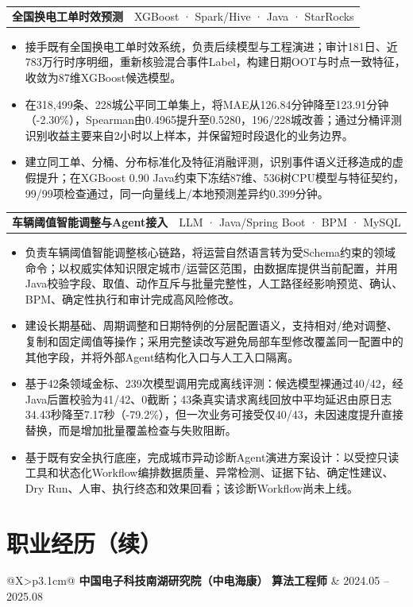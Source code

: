 \documentclass[UTF8,fontset=fandol,10pt,a4paper]{ctexart}
\makeatletter
\newcommand{\daterange}[1]{\textcolor{secondary}{\small #1}}
\newcommand{\companyentry}[4]{%
  \begin{tabularx}{\textwidth}{@{}X>{\raggedleft\arraybackslash}p{3.1cm}@{}}
    \textbf{#1} \quad \textbf{#2} & \daterange{#3} \\
    \multicolumn{2}{@{}l@{}}{\textcolor{secondary}{\small #4}}
  \end{tabularx}
}
\newcommand{\projecttitle}[2]{%
  \vspace{0.18em}%
  \begin{tabularx}{\textwidth}{@{}X>{\raggedleft\arraybackslash}p{7.2cm}@{}}
    \textbf{#1} & \textcolor{secondary}{\small #2}
  \end{tabularx}
}
\makeatother
\begin{document}
\projecttitle{全国换电工单时效预测}{XGBoost · Spark/Hive · Java · StarRocks}
\begin{itemize}
  \item 接手既有全国换电工单时效系统，负责后续模型与工程演进；审计181日、近783万行时序明细，重新核验混合事件Label，构建日期OOT与时点一致特征，收敛为87维XGBoost候选模型。
  \item 在318,499条、228城公平同工单集上，将MAE从126.84分钟降至123.91分钟（-2.30\%），Spearman由0.4965提升至0.5280，196/228城改善；通过分桶评测识别收益主要来自2小时以上样本，并保留短时段退化的业务边界。
  \item 建立同工单、分桶、分布标准化及特征消融评测，识别事件语义迁移造成的虚假提升；在XGBoost 0.90 Java约束下冻结87维、536树CPU模型与特征契约，99/99项检查通过，同一向量线上/本地预测差异约0.399分钟。
\end{itemize}

\projecttitle{车辆阈值智能调整与Agent接入}{LLM · Java/Spring Boot · BPM · MySQL}
\begin{itemize}
  \item 负责车辆阈值智能调整核心链路，将运营自然语言转为受Schema约束的领域命令；以权威实体知识限定城市/运营区范围，由数据库提供当前配置，并用Java校验字段、取值、动作互斥与批量完整性，人工路径经影响预览、确认、BPM、确定性执行和审计完成高风险修改。
  \item 建设长期基础、周期调整和日期特例的分层配置语义，支持相对/绝对调整、复制和固定阈值等操作；采用完整读改写避免局部车型修改覆盖同一配置中的其他字段，并将外部Agent结构化入口与人工入口隔离。
  \item 基于42条领域金标、239次模型调用完成离线评测：候选模型裸通过40/42，经Java后置校验为41/42、0截断；43条真实请求离线回放中平均延迟由原日志34.43秒降至7.17秒（-79.2\%），但一次业务可接受仅40/43，未因速度提升直接替换，而是增加批量覆盖检查与失败阻断。
  \item 基于既有安全执行底座，完成城市异动诊断Agent演进方案设计：以受控只读工具和状态化Workflow编排数据质量、异常检测、证据下钻、确定性建议、Dry Run、人审、执行终态和效果回看；该诊断Workflow尚未上线。
\end{itemize}

\newpage

\section{职业经历（续）}

\companyentry
  {中国电子科技南湖研究院（中电海康）}
  {算法工程师}
  {2024.05 -- 2025.08}
  {大模型应用、深度学习框架与模型部署}
\end{document}
